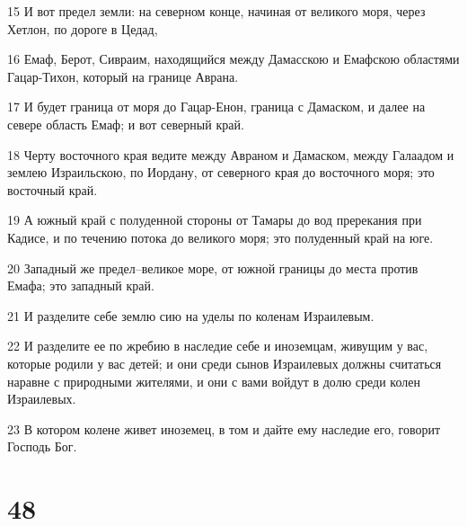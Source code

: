 \par 15 И вот предел земли: на северном конце, начиная от великого моря, через Хетлон, по дороге в Цедад,
\par 16 Емаф, Берот, Сивраим, находящийся между Дамасскою и Емафскою областями Гацар-Тихон, который на границе Аврана.
\par 17 И будет граница от моря до Гацар-Енон, граница с Дамаском, и далее на севере область Емаф; и вот северный край.
\par 18 Черту восточного края ведите между Авраном и Дамаском, между Галаадом и землею Израильскою, по Иордану, от северного края до восточного моря; это восточный край.
\par 19 А южный край с полуденной стороны от Тамары до вод пререкания при Кадисе, и по течению потока до великого моря; это полуденный край на юге.
\par 20 Западный же предел--великое море, от южной границы до места против Емафа; это западный край.
\par 21 И разделите себе землю сию на уделы по коленам Израилевым.
\par 22 И разделите ее по жребию в наследие себе и иноземцам, живущим у вас, которые родили у вас детей; и они среди сынов Израилевых должны считаться наравне с природными жителями, и они с вами войдут в долю среди колен Израилевых.
\par 23 В котором колене живет иноземец, в том и дайте ему наследие его, говорит Господь Бог.

\chapter{48}

